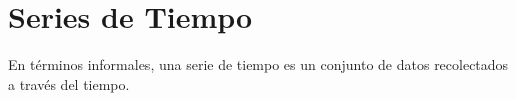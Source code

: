 \section{Series de Tiempo}

En términos informales, una serie de tiempo es un conjunto de datos recolectados a través del tiempo.

